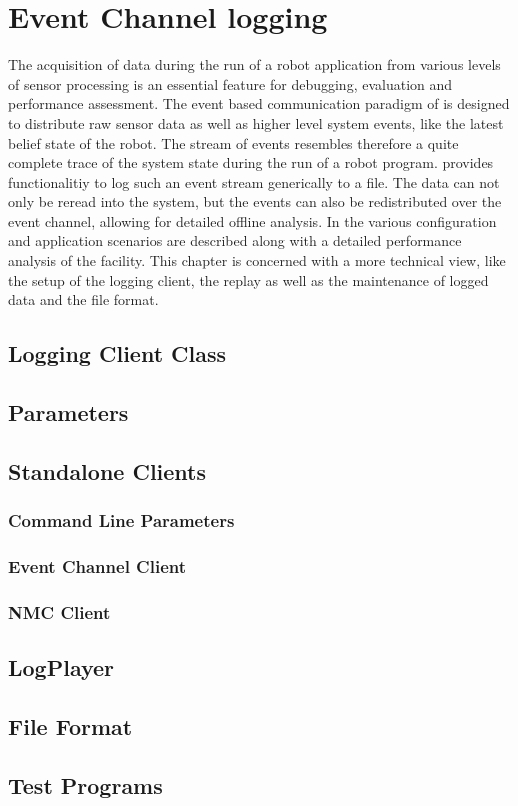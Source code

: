 \chapter{Event Channel logging}
\label{sec:ecLogging}

The acquisition of data during the run of a robot application from
various levels of sensor processing is an essential feature for
debugging, evaluation and performance assessment. The event based
communication paradigm of \miro is designed to distribute raw sensor
data as well as higher level system events, like the latest belief
state of the robot. The stream of events resembles therefore a quite
complete trace of the system state during the run of a robot program.
\miro provides functionalitiy to log such an event stream generically
to a file. The data can not only be reread into the system, but the
events can also be redistributed over the event channel, allowing for
detailed offline analysis. In \cite{Utz+Mayer+Kraetzschmar:04} the
various configuration and application scenarios are described along
with a detailed performance analysis of the facility. This chapter is
concerned with a more technical view, like the setup of the logging
client, the replay as well as the maintenance of logged data and the
file format.

\section{Logging Client Class}

\section{Parameters}

\section{Standalone Clients}

\subsection{Command Line Parameters}

\subsection{Event Channel Client}

\subsection{NMC Client}

\section{LogPlayer}

\section{File Format}

\section{Test Programs}

